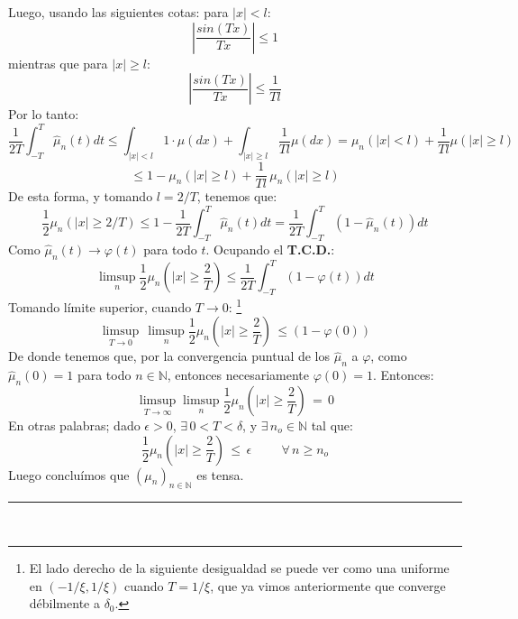 \documentclass[a4paper]{article}
\numberwithin{equation}{subsection}
\def\N{\mathbb N}
\def\to{\rightarrow}
\begin{document}
\begin{itemize}
    Luego, usando las siguientes cotas: para $|x|<l$:
    \[\left|\frac{sin(Tx)}{Tx}\right| \leq 1\]
    mientras que para  $|x|\geq l$:
    \[\left|\frac{sin(Tx)}{Tx}\right| \leq \frac{1}{Tl}\]
    Por lo tanto:
    \[\frac{1}{2T}\int_{-T}^{T}\hat{\mu}_n(t)dt \leq \int_{|x|<l}1\cdot \mu(dx) + \int_{|x|\geq l}\frac{1}{Tl}\mu(dx) = \mu_n(|x|<l) +\frac{1}{Tl}\mu(|x|\geq l)\]
    \[\leq 1 - \mu_n(|x|\geq l) +\frac{1}{Tl}\,\mu_n(|x|\geq l)\]
    De esta forma, y tomando $l = 2/T$, tenemos que:
    \[\frac{1}{2}\mu_n(|x|\geq 2/T) \leq 1 - \frac{1}{2T}\int_{-T}^{T}\hat{\mu}_n(t)dt = \frac{1}{2T}\int_{-T}^{T}\left(1-\hat{\mu}_n(t)\right)dt\]
    Como $\hat{\mu}_n(t) \rightarrow\varphi(t)$ para todo $t$. Ocupando el \textbf{T.C.D.}:
    \[\limsup_{n}\frac{1}{2}\mu_n(|x|\geq \frac{2}{T}) \leq \frac{1}{2T}\int_{-T}^{T}(1-\varphi(t)) dt\]
    Tomando límite superior, cuando $T\rightarrow 0$: \footnote{El lado derecho de la siguiente desigualdad se puede ver como una uniforme en $(-1/\xi,1/\xi)$ cuando $T=1/\xi$, que ya vimos anteriormente que converge débilmente  a $\delta_0$.}
    \[\limsup_{T\to 0}\,\limsup_{n}\frac{1}{2}\mu_n(|x|\geq\frac{2}{T})\,\leq (1-\varphi(0))\]
    De donde tenemos que, por la convergencia puntual de los $\hat{\mu}_n$ a $\varphi$, como $\hat{\mu}_n(0)=1$ para todo $n\in\N$, entonces necesariamente $\varphi(0)=1$. Entonces:
    \[\limsup_{T\to \infty}\limsup_{n}\frac{1}{2}\mu_n(|x|\geq\frac{2}{T})\,=\, 0\]
    En otras palabras; dado $\epsilon >0$, $\exists\,0<T<\delta$, y $\exists\,n_o \in \N$ tal que:
    \[\frac{1}{2}\mu_n(|x|\geq \frac{2}{T})\,\leq\,\epsilon\hspace{1cm}\forall\,n\geq n_o\]
    Luego concluímos que $(\mu_n)_{n\in\N}$ es tensa. \rule{0.7em}{0.7em}\\ \newline
\end{itemize}
\end{document}
